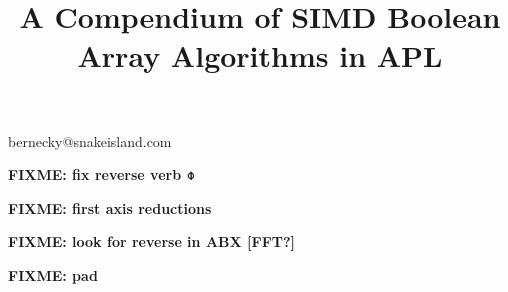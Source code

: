 \documentclass[11pt,preprint]{sigplanconf}
\begin{document}

\title{A Compendium of SIMD Boolean Array Algorithms in APL}

{bernecky@snakeisland.com}

\maketitle

\def\ibmapl{$APL\backslash\0360$}

\newcommand{\fixme}[1]{{ \color{red} \bf FIXME: #1}}

\newcommand{\fig}[2]{{%
\begin{figure}%
\texttt{[image: \#1]}%
\caption{#2}%
\label{#1}%
\end{figure}%
}}


\fixme{fix reverse verb ⌽}

\fixme{first axis reductions}

\fixme{look for reverse in ABX [FFT?]}

\fixme{pad}


















\begin{onecolumn}


 

\end{onecolumn}
\end{document}
